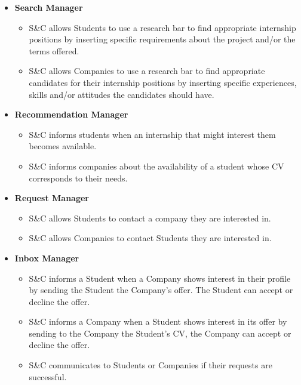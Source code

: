\begin{itemize}
        \item \textbf{Search Manager}
        \begin{itemize}
            \item[\text{[R10]}] S\&C allows Students to use a research bar to find appropriate internship positions by inserting specific requirements about the project and/or the terms offered.
            \item[\text{[R11]}] S\&C allows Companies to use a research bar to find appropriate candidates for their internship positions by inserting specific experiences, skills and/or attitudes the candidates should have.
        \end{itemize}

        \item \textbf{Recommendation Manager}
        \begin{itemize}
            \item [\text{[R12]}] S\&C informs students when an internship that might interest them becomes available.
            \item [\text{[R13]}] S\&C informs companies about the availability of a student whose CV corresponds to their needs. 
        \end{itemize}
        
    \item \textbf{Request Manager}
        \begin{itemize}
            \item [\text{[R14]}] S\&C allows Students to contact a company they are interested in.
            \item [\text{[R15]}] S\&C allows Companies to contact Students they are interested in.
            
        \end{itemize}

        \item \textbf{Inbox Manager}
        \begin{itemize}
            \item [\text{[R16]}] S\&C informs a Student when a Company shows interest in their profile by sending the Student the Company's offer. The Student can accept or decline the offer.
            \item [\text{[R17]}] S\&C informs a Company when a Student shows interest in its offer by sending to the Company the Student's CV, the Company can accept or decline the offer.
            \item [\text{[R18]}] S\&C communicates to Students or Companies if their requests are successful.
        \end{itemize}


\end{itemize}
